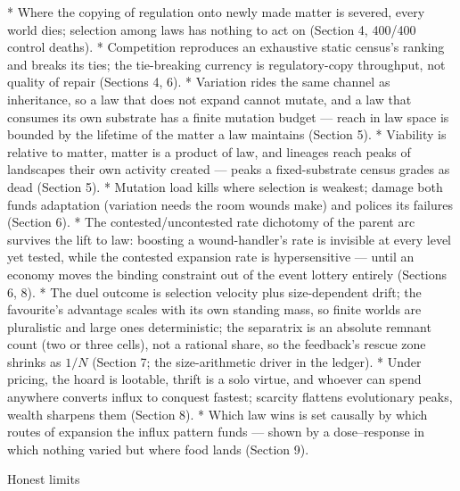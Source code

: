 \begitems
*  Where the copying
of regulation onto newly made matter is severed, every world
dies; selection among laws has nothing to act on (Section 4,
400/400 control deaths).
*  Competition reproduces an
exhaustive static census's ranking and breaks its ties; the
tie-breaking currency is regulatory-copy throughput, not quality
of repair (Sections 4, 6).
*  Variation rides the
same channel as inheritance, so a law that does not expand cannot
mutate, and a law that consumes its own substrate has a finite
mutation budget --- reach in law space is bounded by the lifetime
of the matter a law maintains (Section 5).
*  Viability is
relative to matter, matter is a product of law, and lineages
reach peaks of landscapes their own activity created --- peaks a
fixed-substrate census grades as dead (Section 5).
*  Mutation load
kills where selection is weakest; damage both funds adaptation
(variation needs the room wounds make) and polices its failures
(Section 6).
*  The
contested/uncontested rate dichotomy of the parent arc survives
the lift to law: boosting a wound-handler's rate is invisible at
every level yet tested, while the contested expansion rate is
hypersensitive --- until an economy moves the binding constraint
out of the event lottery entirely (Sections 6, 8).
*  The duel outcome is
selection velocity plus size-dependent drift; the favourite's
advantage scales with its own standing mass, so finite worlds are
pluralistic and large ones deterministic; the separatrix is an
absolute remnant count (two or three cells), not a rational
share, so the feedback's rescue zone shrinks as $1/N$ (Section 7;
the size-arithmetic driver  in the ledger).
*  Under pricing, the hoard
is lootable, thrift is a solo virtue, and whoever can spend
anywhere converts influx to conquest fastest; scarcity flattens
evolutionary peaks, wealth sharpens them (Section 8).
*  Which law wins
is set causally by which routes of expansion the influx pattern
funds --- shown by a dose--response in which nothing varied but
where food lands (Section 9).
\enditems

\sec Honest limits

